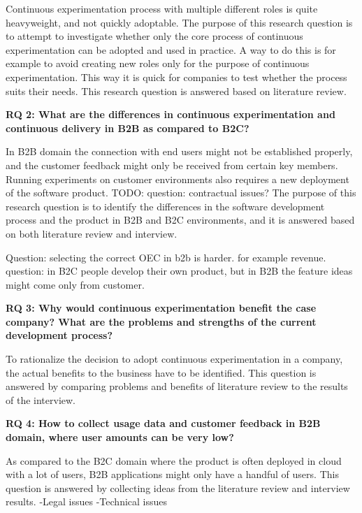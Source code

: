 \documentclass[english]{tktltiki2}
\theoremstyle{definition}
\theoremstyle{remark}
\begin{document}
\noindent Continuous experimentation process with multiple different roles is quite heavyweight, and not quickly adoptable. The purpose of this research question is to attempt to investigate whether only the core process of continuous experimentation can be adopted and used in practice. A way to do this is for example to avoid creating new roles only for the purpose of continuous experimentation. This way it is quick for companies to test whether the process suits their needs. This research question is answered based on literature review. \newline


\noindent \textbf{RQ 2: What are the differences in continuous experimentation and continuous delivery in B2B as compared to B2C?}

\noindent In B2B domain the connection with end users might not be established properly, and the customer feedback might only be received from certain key members. Running experiments on customer environments also requires a new deployment of the software product. TODO: question: contractual issues? The purpose of this research question is to identify the differences in the software development process and the product in B2B and B2C environments, and it is answered based on both literature review and interview. \newline

Question: selecting the correct OEC in b2b is harder. for example revenue. 
question: in B2C people develop their own product, but in B2B the feature ideas might come only from customer.

\noindent \textbf{RQ 3: Why would continuous experimentation benefit the case company? What are the problems and strengths of the current development process?}

\noindent To rationalize the decision to adopt continuous experimentation in a company, the actual benefits to the business have to be identified. This question is answered by comparing problems and benefits of literature review to the results of the interview. \newline

\noindent \textbf{RQ 4: How to collect usage data and customer feedback in B2B domain, where user amounts can be very low?}

\noindent As compared to the B2C domain where the product is often deployed in cloud with a lot of users, B2B applications might only have a handful of users. This question is answered by collecting ideas from the literature review and interview results. \newline
-Legal issues
-Technical issues
\end{document}

